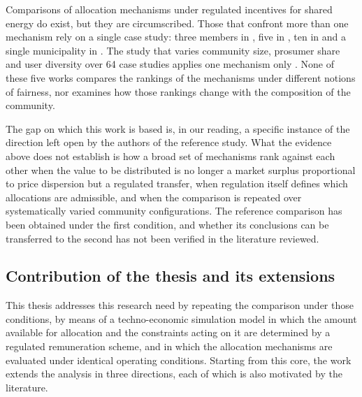 Comparisons of allocation mechanisms under regulated incentives for shared energy do exist, but they are circumscribed. Those that confront more than one mechanism rely on a single case study: three members in \cite{volpato2023}, five in \cite{trevisan2024}, ten in \cite{fioriti2023} and a single municipality in \cite{campagna2024}. The study that varies community size, prosumer share and user diversity over 64 case studies applies one mechanism only \cite{ferrucci2025}. None of these five works compares the rankings of the mechanisms under different notions of fairness, nor examines how those rankings change with the composition of the community.

The gap on which this work is based is, in our reading, a specific instance of the direction left open by the authors of the reference study. What the evidence above does not establish is how a broad set of mechanisms rank against each other when the value to be distributed is no longer a market surplus proportional to price dispersion but a regulated transfer, when regulation itself defines which allocations are admissible, and when the comparison is repeated over systematically varied community configurations. The reference comparison has been obtained under the first condition, and whether its conclusions can be transferred to the second has not been verified in the literature reviewed.

\subsection*{Contribution of the thesis and its extensions}

This thesis addresses this research need by repeating the comparison under those conditions, by means of a techno-economic simulation model in which the amount available for allocation and the constraints acting on it are determined by a regulated remuneration scheme, and in which the allocation mechanisms are evaluated under identical operating conditions. Starting from this core, the work extends the analysis in three directions, each of which is also motivated by the literature.

